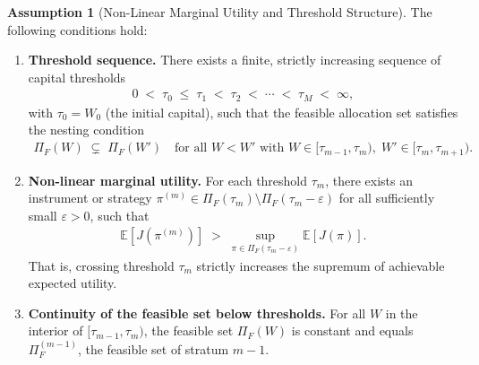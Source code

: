 \documentclass[12pt,openany]{book}
\newcommand{\E}{\mathbb{E}}
\numberwithin{equation}{chapter}
\theoremstyle{plain}
\theoremstyle{definition}
\newtheorem{assumption}[theorem]{Assumption}
\theoremstyle{remark}
\numberwithin{equation}{chapter}
\theoremstyle{plain}
\begin{document}
\begin{assumption}[Non-Linear Marginal Utility and Threshold Structure]
\label{asm:nonlinear-utility}
\label{asm:utility-monotone}
\label{asm:risk-constraints}
\label{asm:risk-aversion}
The following conditions hold:
\begin{enumerate}
  \item[\textup{(i)}] \textbf{Threshold sequence.}
        There exists a finite, strictly increasing sequence of
        capital thresholds
        \begin{align}
          0 \;<\; \tau_0 \;\leq\; \tau_1 \;<\; \tau_2
          \;<\; \cdots \;<\; \tau_M \;<\; \infty,
          \label{eq:threshold-sequence}
        \end{align}
        with $\tau_0 = W_0$ (the initial capital), such that
        the feasible allocation set satisfies the nesting condition
        \begin{align}
          \Pi_F(W) \;\subsetneq\; \Pi_F(W')
          \quad \text{for all } W < W'
          \text{ with } W \in [\tau_{m-1}, \tau_m),\;
          W' \in [\tau_m, \tau_{m+1}).
          \label{eq:nesting}
        \end{align}

  \item[\textup{(ii)}] \textbf{Non-linear marginal utility.}
        For each threshold $\tau_m$, there exists an instrument
        or strategy $\pi^{(m)} \in \Pi_F(\tau_m) \setminus
        \Pi_F(\tau_m - \varepsilon)$ for all sufficiently small
        $\varepsilon > 0$, such that
        \begin{align}
          \E\!\left[J\!\left(\pi^{(m)}\right)\right]
          \;>\; \sup_{\pi \in \Pi_F(\tau_m - \varepsilon)}
          \E\!\left[J(\pi)\right].
          \label{eq:strict-threshold-improve}
        \end{align}
        That is, crossing threshold $\tau_m$ strictly increases
        the supremum of achievable expected utility.

  \item[\textup{(iii)}] \textbf{Continuity of the feasible set below
        thresholds.}  For all $W$ in the interior of
        $[\tau_{m-1}, \tau_m)$, the feasible set $\Pi_F(W)$ is
        constant and equals $\Pi_F^{(m-1)}$, the feasible set of
        stratum $m-1$.
\end{enumerate}
\end{assumption}
\end{document}
